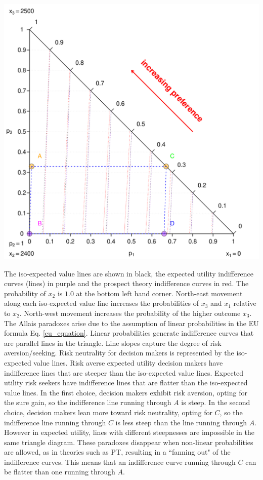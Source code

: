 \documentclass{article}\usepackage[]{graphicx}\usepackage[]{color}
\newenvironment{knitrout}{}{} %
\begin{document}
\begin{knitrout}
{\centering \includegraphics[width=0.8\linewidth]{figure/unnamed-chunk-8} 

}



\end{knitrout}


The iso-expected value lines are shown in black, the expected utility indifference curves (lines) in purple and the prospect theory indifference curves in red. The probability of $x_2$ is $1.0$ at the bottom left hand corner. North-east movement along each iso-expected value line increases the probabilities of $x_3$ and $x_1$ relative to $x_2$. North-west movement increases the probability of the higher outcome $x_3$. The Allais paradoxes arise due to the assumption of linear probabilities in the EU formula Eq. \eqref{eu_equation}. Linear probabilities generate
 indifference curves that are parallel lines in the triangle. Line slopes capture the degree of risk aversion/seeking. Risk neutrality for decision makers is represented by the iso-expected value lines. Risk averse expected utility decision makers have indifference lines that are steeper than the iso-expected value lines. Expected utility risk seekers
have indifference lines that are flatter than the iso-expected value lines. In the first choice, decision
makers exhibit risk aversion, opting for the sure gain, so the indifference line running through $A$ is
steep. In the second choice, decision makers lean more toward risk neutrality, opting for $C$, so the indifference line running through $C$ is less steep than the line running through $A$. However in expected utility, lines with different steepnesses are impossible in the same triangle diagram.
These paradoxes disappear when non-linear probabilities are allowed, as in theories such as PT, resulting in a ``fanning out" of the indifference curves. This means that an indifference
curve running through $C$ can be flatter than one running through $A$.
\end{document}
